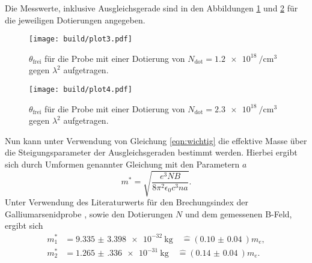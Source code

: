 Die Messwerte, inklusive Ausgleichsgerade sind in den Abbildungen \ref{plt1} und \ref{plt2} für die jeweiligen Dotierungen angegeben.
\begin{figure}
    \centering
    \texttt{[image: build/plot3.pdf]}
    \caption{$\theta_{\text{frei}}$ für die Probe mit einer Dotierung von $N_{\text{dot}}=\SI{1.2e18}{\per\centi\meter\tothe{3}}$ gegen $\lambda^2$ aufgetragen.}
    \label{plt1}
\end{figure}
\begin{figure}
    \centering
    \texttt{[image: build/plot4.pdf]}
    \caption{$\theta_{\text{frei}}$ für die Probe mit einer Dotierung von $N_{\text{dot}}=\SI{2.3e18}{\per\centi\meter\tothe{3}}$ gegen $\lambda^2$ aufgetragen.}
    \label{plt2}
\end{figure}
Nun kann unter Verwendung von Gleichung \eqref{eqn:wichtig} die effektive Masse über die Steigungsparameter der Ausgleichsgeraden bestimmt werden.
Hierbei ergibt sich durch Umformen genannter Gleichung mit den Parametern $a$
\begin{equation}
m^{*} = \sqrt{\frac{e^3 NB}{8 \pi^2 \epsilon_0 c^3 n a}}.
\end{equation}
Unter Verwendung des Literaturwerts für den Brechungsindex der Galliumarsenidprobe \cite{GaAs}, sowie den Dotierungen $N$ und dem gemessenen B-Feld, ergibt sich
\begin{align}
m_1^{*} &= \SI{9.335(3398)e-32}{\kilo\gram} \quad \hat{=} (\SI{0.10(4)}{})m_e,\\
m_2^{*} &= \SI{1.265(336)e-31}{\kilo\gram} \quad \hat{=} (\SI{0.14(4)}{})m_e.
\end{align}
